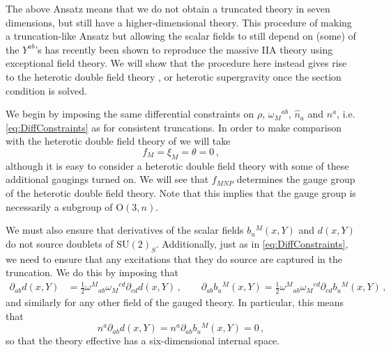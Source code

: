 \documentclass{PoS}
\newcommand{\ON}[1]{\mathrm{O}( #1 )}
\newcommand{\SU}[1]{\mathrm{SU}( #1 )}
\begin{document}
The above Ansatz means that we do not obtain a truncated theory in seven dimensions, but still have a higher-dimensional theory. This procedure of making a truncation-like Ansatz but allowing the scalar fields to still depend on (some) of the $Y^{ab}$'s has recently been shown \cite{Ciceri:2016dmd} to reproduce the massive IIA theory \cite{Cassani:2016ncu} using exceptional field theory. We will show that the procedure here instead gives rise to the heterotic double field theory \cite{Siegel:1993th,Siegel:1993xq,Hohm:2011ex}, or heterotic supergravity once the section condition is solved.

We begin by imposing the same differential constraints on $\rho$, $\omega_M{}^{ab}$, $\hat{n}_a$ and $n^a$, i.e. \eqref{eq:DiffConstraints} as for consistent truncations. In order to make comparison with the heterotic double field theory of \cite{Hohm:2011ex} we will take
\begin{equation}
 f_M = \xi_M = \theta = 0 \,,
\end{equation}
although it is easy to consider a heterotic double field theory with some of these additional gaugings turned on. We will see that $f_{MNP}$ determines the gauge group of the heterotic double field theory. Note that this implies that the gauge group is necessarily a subgroup of $\ON{3,n}$.

We must also ensure that derivatives of the scalar fields $b_u{}^M(x,Y)$ and $d(x,Y)$ do not source doublets of $\SU{2}_S$. Additionally, just as in \eqref{eq:DiffConstraints}, we need to ensure that any excitations that they do source are captured in the truncation. We do this by imposing that
\begin{equation}
 \begin{split}
  \partial_{ab} d(x,Y) &= \frac12 \omega^M{}_{ab} \omega_M{}^{cd} \partial_{cd} d(x,Y) \,, \qquad \partial_{ab} b_u{}^M(x,Y) = \frac12 \omega^M{}_{ab} \omega_M{}^{cd} \partial_{cd} b_u{}^M(x,Y) \,, \label{eq:HetDiffConstraints}
 \end{split}
\end{equation}
and similarly for any other field of the gauged theory. In particular, this means that
\begin{equation}
 n^a \partial_{ab} d(x,Y) = n^a \partial_{ab} b_u{}^M(x,Y) = 0 \,,
\end{equation}
so that the theory effective has a six-dimensional internal space.
\end{document}
